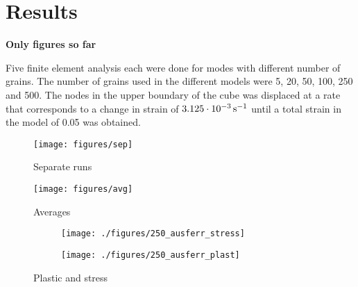 \documentclass[crystal_plast.tex]{subfiles}
\begin{document}
\section{Results}

\textbf{Only figures so far}

Five finite element analysis each were done for modes with different number of grains. The number of grains used in the different models were 5, 20, 50, 100, 250 and 500. The nodes in the upper boundary of the cube was displaced at a rate that corresponds to a change in strain of $\unit[3.125 \cdot 10^{-3}]{s^{-1}}$ until a total strain in the model of 0.05 was obtained.

\cite{Nygårds2002513}


\begin{figure}[ht]
\centering
\texttt{[image: figures/sep]}
\caption{Separate runs}
\label{fig:sep}
\end{figure}

\begin{figure}[ht]
\centering
\texttt{[image: figures/avg]}
\caption{Averages}
\label{fig:avg}
\end{figure}

 \begin{figure}
\centering
\begin{subfigure}{.7\textwidth}
  \centering
  \texttt{[image: ./figures/250\_ausferr\_stress]}
  \caption{}
  \label{fig:ausferr_stress}
\end{subfigure}%

\begin{subfigure}{.7\textwidth}
  \centering
  \texttt{[image: ./figures/250\_ausferr\_plast]}
  \caption{}
  \label{fig:ausferr_plast}
\end{subfigure}
\caption{Plastic and stress}
\label{fig:ausferr}
\end{figure}



\newpage
\end{document}
